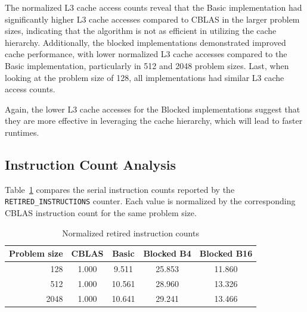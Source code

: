 \begin{table}[H]
    \centering
    \caption{Normalized L3 cache accesses}
    \label{tab:normalized_l3_accesses}
    \small
\end{table}

The normalized L3 cache access counts reveal that the Basic implementation had significantly higher L3 cache accesses compared to CBLAS in the larger problem sizes, indicating that the algorithm is not as efficient in utilizing the cache hierarchy. Additionally, the blocked implementations demonstrated improved cache performance, with lower normalized L3 cache accesses compared to the Basic implementation, particularly in 512 and 2048 problem sizes. Last, when looking at the problem size of 128, all implementations had similar L3 cache access counts.

Again, the lower L3 cache accesses for the Blocked implementations suggest that they are more effective in leveraging the cache hierarchy, which will lead to faster runtimes. \cite{bethel_lecture_13} \cite{bethel_lecture_14}

\subsection{Instruction Count Analysis}

Table~\ref{tab:normalized_retired_instructions} compares the serial instruction
counts reported by the \texttt{RETIRED\_INSTRUCTIONS} counter. Each value is
normalized by the corresponding CBLAS instruction count for the same problem
size.

\begin{table}[H]
    \centering
    \caption{Normalized retired instruction counts}
    \label{tab:normalized_retired_instructions}
    \small
    \begin{tabular}{@{}rcccc@{}}
        \toprule
        Problem size & CBLAS & Basic & Blocked B4 & Blocked B16 \\
        \midrule
        128  & 1.000 & 9.511  & 25.853 & 11.860 \\
        512  & 1.000 & 10.561 & 28.960 & 13.326 \\
        2048 & 1.000 & 10.641 & 29.241 & 13.466 \\
        \bottomrule
    \end{tabular}
\end{table}

